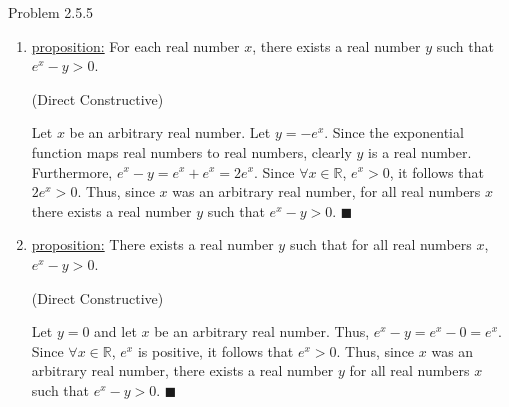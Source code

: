 \documentclass{article}
\theoremstyle{definition}
\newcommand{\R}{\mathbb{R}}
\begin{document}
	\vspace{1cm}
	\newpage

	\noindent Problem 2.5.5  \vspace{0.3cm}

	\begin{enumerate}
		\item
		\underline{proposition:} For each real number $x$, there exists a
		real number $y$ such that $e^{x}-y>0$.

		\vspace{0.2cm}

		 (Direct Constructive)

		\vspace{0.2cm}

		Let $x$ be an arbitrary real number. Let $y=-e^{x}$. Since the
		exponential function maps real numbers to real numbers, clearly $y$
		is a real number. Furthermore,
		$e^{x}-y=e^{x}+e^{x}=2e^{x}$. Since $\forall x\in\R$,
		$e^{x}>0$, it follows that $2e^{x}>0$. Thus, since $x$ was an
		arbitrary real number, for all real numbers $x$ there exists a real
		number $y$ such that $e^{x}-y>0$. $\blacksquare$

		\item
		\underline{proposition:} There exists a real number $y$ such that
		for all real numbers $x$, $e^{x}-y>0$.

		\vspace{0.2cm}

		 (Direct Constructive)

		\vspace{0.2cm}

		Let $y=0$ and let $x$ be an arbitrary real number. Thus,
		$e^{x}-y=e^{x}-0=e^{x}$. Since $\forall x\in\R$, $e^{x}$ is
		positive, it follows that $e^{x}>0$. Thus, since $x$ was an
		arbitrary real number, there exists a real number $y$ for all real
		numbers $x$ such that $e^{x}-y>0$. $\blacksquare$

	\end{enumerate}

	\vspace{1cm}



\end{document}
